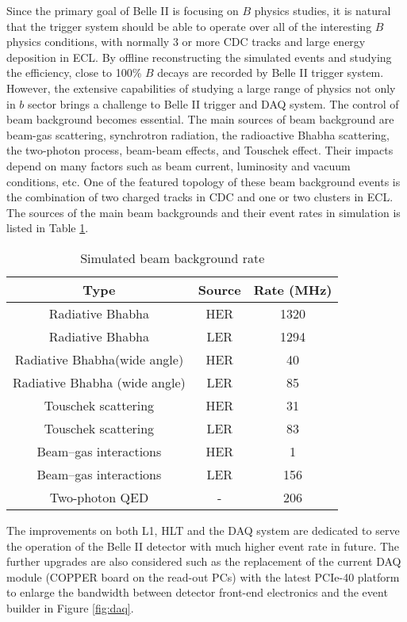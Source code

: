Since the primary goal of Belle II is focusing on $B$ physics studies, it is natural that the trigger system should be able to operate over all of the interesting $B$ physics conditions, with normally 3 or more CDC tracks and large energy deposition in ECL. By offline reconstructing the simulated events and studying the efficiency, close to 100\% $B$ decays are recorded by Belle II trigger system. However, the extensive capabilities of studying a large range of physics not only in $b$ sector brings a challenge to Belle II trigger and DAQ system. The control of beam background becomes essential. The main sources of beam background are beam-gas scattering, synchrotron radiation, the radioactive Bhabha scattering, the two-photon process, beam-beam effects, and Touschek effect. Their impacts depend on many factors such as beam current, luminosity and vacuum conditions, etc. One of the featured topology of these beam background events is the combination of two charged tracks in CDC and one or two clusters in ECL. The sources of the main beam backgrounds and their event rates in simulation is listed in Table \ref{tab:BG}.

\begin{table}[htbp]
	\centering
	\large
	\caption{Simulated beam background rate\cite{b2book}}
	\label{tab:BG}
	\begin{tabular}{c c c}
		\toprule
		Type & Source & Rate (MHz)\\
		\hline
		Radiative Bhabha & HER &  1320\\
		Radiative Bhabha & LER &  1294\\
		Radiative Bhabha(wide angle) & HER &  40\\
		Radiative Bhabha (wide angle) & LER &  85\\
		Touschek scattering & HER &  31\\
		Touschek scattering & LER &  83\\
		Beam–gas interactions & HER &  1\\
		Beam–gas interactions & LER &  156\\
		Two-photon QED & - & 206\\
		\bottomrule
	\end{tabular}
\end{table}

The improvements on both L1, HLT and the DAQ system are dedicated to serve the operation of the Belle II detector with much higher event rate in future. The further upgrades are also considered such as the replacement of the current DAQ module (COPPER board\cite{Abe:2010gxa} on the read-out PCs) with the latest PCIe-40 platform\cite{mitra2016gbt} to enlarge the bandwidth between detector front-end electronics and the event builder in Figure \ref{fig:daq}.


